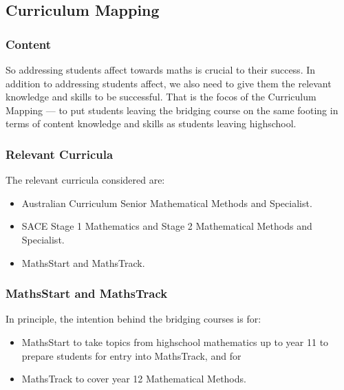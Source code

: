 \documentclass[14pt]{beamer}
\begin{document}
\subsection{Curriculum Mapping}

\begin{frame}
\frametitle{Content}
So addressing students affect towards maths is crucial to their success. In addition to addressing students affect, we also need to give them the relevant knowledge and skills to be successful. That is the focos of the Curriculum Mapping --- to put students leaving the bridging course on the same footing in terms of content knowledge and skills as students leaving highschool. 
\end{frame}

\begin{frame}
\frametitle{Relevant Curricula}
The relevant curricula considered are:
\begin{itemize}
	\item Australian Curriculum Senior Mathematical Methods and Specialist.
	\item SACE Stage 1 Mathematics and Stage 2 Mathematical Methods and Specialist.
	\item MathsStart and MathsTrack.
\end{itemize}
\end{frame}

\begin{frame}
\frametitle{MathsStart and MathsTrack}
In principle, the intention behind the bridging courses is for:
\begin{itemize}
	\item MathsStart to take topics from highschool mathematics up to year 11 to prepare students for entry into MathsTrack, and for
	\item MathsTrack to cover year 12 Mathematical Methods.
\end{itemize}
\end{frame}

%
%
\end{document}
